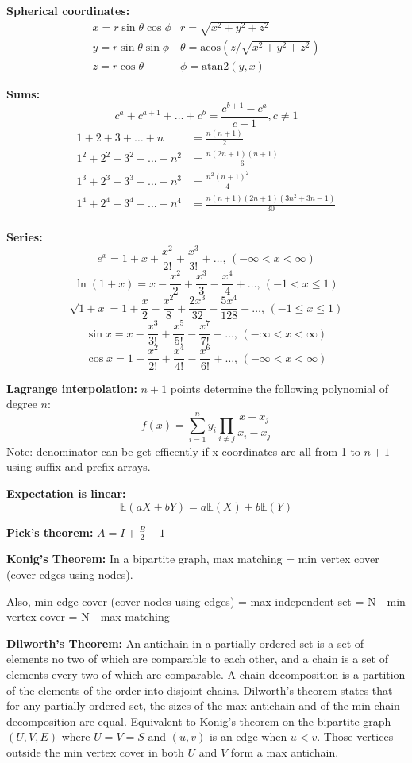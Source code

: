 \noindent
\textbf{Spherical coordinates:}
\[\begin{array}{cc}
x = r\sin\theta\cos\phi & r = \sqrt{x^2+y^2+z^2}\\
y = r\sin\theta\sin\phi & \theta = \textrm{acos}(z/\sqrt{x^2+y^2+z^2})\\
z = r\cos\theta & \phi = \textrm{atan2}(y,x)
\end{array}\]

\noindent
\textbf{Sums:}
\[ c^a + c^{a+1} + \dots + c^{b} = \frac{c^{b+1} - c^a}{c-1}, c \neq 1 \]
\begin{align*}
	1 + 2 + 3 + \dots + n &= \frac{n(n+1)}{2} \\
	1^2 + 2^2 + 3^2 + \dots + n^2 &= \frac{n(2n+1)(n+1)}{6} \\
	1^3 + 2^3 + 3^3 + \dots + n^3 &= \frac{n^2(n+1)^2}{4} \\
	1^4 + 2^4 + 3^4 + \dots + n^4 &= \frac{n(n+1)(2n+1)(3n^2 + 3n - 1)}{30} \\
\end{align*}

\noindent
\textbf{Series:}
$$e^x = 1+x+\frac{x^2}{2!}+\frac{x^3}{3!}+\dots,\,(-\infty<x<\infty)$$
$$\ln(1+x) = x-\frac{x^2}{2}+\frac{x^3}{3}-\frac{x^4}{4}+\dots,\,(-1<x\leq1)$$
$$\sqrt{1+x} = 1+\frac{x}{2}-\frac{x^2}{8}+\frac{2x^3}{32}-\frac{5x^4}{128}+\dots,\,(-1\leq x\leq1)$$
$$\sin x = x-\frac{x^3}{3!}+\frac{x^5}{5!}-\frac{x^7}{7!}+\dots,\,(-\infty<x<\infty)$$
$$\cos x = 1-\frac{x^2}{2!}+\frac{x^4}{4!}-\frac{x^6}{6!}+\dots,\,(-\infty<x<\infty)$$

\noindent
\textbf{Lagrange interpolation:} $n+1$ points determine the following polynomial of degree $n$:
\[ f(x)=\sum\limits_{i=1}^n y_i\prod _{i\neq j}\dfrac{x-x_j}{x_i-x_j} \]
Note: denominator can be get efficently if x coordinates are all from 1 to $n+1$ using suffix and prefix arrays.

\noindent
\textbf{Expectation is linear:} \[\mathbb{E}(aX+bY) = a\mathbb{E}(X)+b\mathbb{E}(Y)\]

\noindent
\textbf{Pick's theorem:} $A=I+\frac{B}{2}-1$

\noindent
\textbf{Konig's Theorem:} In a bipartite graph, max matching = min vertex cover (cover edges using nodes).

\noindent
Also, min edge cover (cover nodes using edges) = max independent set = N - min vertex cover = N - max matching

\noindent
\textbf{Dilworth's Theorem:} An antichain in a partially ordered set is a set of elements no two of which are comparable to each other, and a chain is a set of elements every two of which are comparable. A chain decomposition is a partition of the elements of the order into disjoint chains. Dilworth's theorem states that for any partially ordered set, the sizes of the max antichain and of the min chain decomposition are equal. Equivalent to Konig's theorem on the bipartite graph $(U,V,E)$ where $U=V=S$ and $(u,v)$ is an edge when $u<v$. Those vertices outside the min vertex cover in both $U$ and $V$ form a max antichain.

